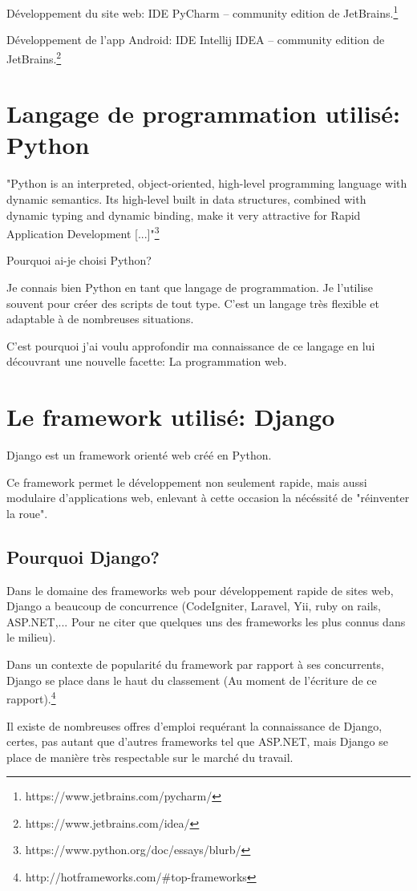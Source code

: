 \documentclass[12pt,table,a4paper]{report}
\begin{document}
Développement du site web: IDE PyCharm – community edition de JetBrains.\footnote{https://www.jetbrains.com/pycharm/}

Développement de l'app Android: IDE Intellij IDEA – community edition de JetBrains.\footnote{https://www.jetbrains.com/idea/}

\section{Langage de programmation utilisé: Python}
"Python is an interpreted, object-oriented, high-level programming language with dynamic semantics. Its high-level built in data structures, combined with dynamic typing and dynamic binding, make it very attractive for Rapid Application Development [...]"\footnote{https://www.python.org/doc/essays/blurb/}

Pourquoi ai-je choisi Python? 

Je connais bien Python en tant que langage de programmation. Je l'utilise souvent pour créer des scripts de tout type. C'est un langage très flexible et adaptable à de nombreuses situations.

C'est pourquoi j'ai voulu approfondir ma connaissance de ce langage en lui découvrant une nouvelle facette: La programmation web.

\section{Le framework utilisé: Django}
Django est un framework orienté web créé en Python.

Ce framework permet le développement non seulement rapide, mais aussi modulaire d'applications web, enlevant à cette occasion la nécéssité de "réinventer la roue".

\subsection{Pourquoi Django?}
Dans le domaine des frameworks web pour développement rapide de sites web, Django a beaucoup de concurrence (CodeIgniter, Laravel, Yii, ruby on rails, ASP.NET,... Pour ne citer que quelques uns des frameworks les plus connus dans le milieu).

Dans un contexte de popularité du framework par rapport à ses concurrents, Django se place dans le haut du classement (Au moment de l'écriture de ce rapport).\footnote{http://hotframeworks.com/\#top-frameworks}

Il existe de nombreuses offres d'emploi requérant la connaissance de Django, certes, pas autant que d'autres frameworks tel que ASP.NET, mais Django se place de manière très respectable sur le marché du travail.
\end{document}
